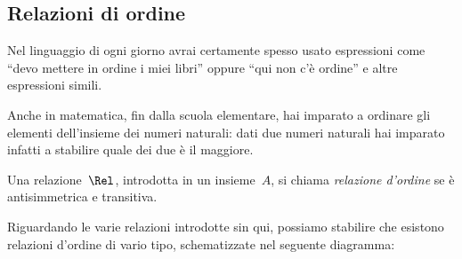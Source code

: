 \begin{comment}
\begin{definizione}
Si chiama \emph{insieme quoziente} di un insieme~\(A\) rispetto a una relazione di 
equivalenza~\(\Rel\),
l'insieme i cui elementi sono le classi d'equivalenza determinate dalla 
relazione~\(\Rel\). L'insieme quoziente si indica con il simbolo~\(A/\Rel\).
\end{definizione}

Nel caso dell'esempio precedente si passa all'insieme quoziente~\(B/\Rel\) del 
seguente diagramma di Eulero-Venn:
\begin{center}
 
\end{center}


\osservazione Ogni volta che si ha una relazione d'equivalenza~\(\Rel\) in un 
insieme~\(A\), possiamo stabilire la seguente
catena di passaggi:
 \[\text{insieme }A\rightarrow\text{ partizione }P(A)\rightarrow\text{ insieme 
quoziente }A/\Rel.\]



\end{comment}

\subsection{Relazioni di ordine}
\label{subsec:rel_ordine}

Nel linguaggio di ogni giorno avrai certamente spesso usato espressioni come 
``devo mettere in ordine i miei
libri'' oppure ``qui non c'è ordine'' e altre espressioni simili.

Anche in matematica, fin dalla scuola elementare, hai imparato a ordinare gli 
elementi dell'insieme dei
numeri naturali: dati due numeri naturali hai imparato infatti a stabilire quale 
dei due è il maggiore.

\begin{definizione}
Una relazione~\(\Rel\), introdotta in un insieme~\(A\), si chiama \emph{relazione 
d'ordine} se è antisimmetrica e transitiva.
\end{definizione}

Riguardando le varie relazioni introdotte sin qui, possiamo stabilire che 
esistono relazioni d'ordine di vario tipo, schematizzate nel seguente diagramma:
\begin{center}
 
\end{center}

